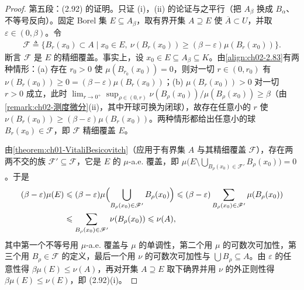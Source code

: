 \documentclass[../../main.tex]{subfiles}%
\begin{document}
\begin{proof}
第五段：(2.92) 的证明。只证 (i)，(ii) 的论证与之平行（把 $A_\beta$ 换成 $B_\alpha$、不等号反向）。固定 Borel 集 $E\subseteq A_\beta$，取有界开集 $A\supseteq E$ 使 $\overline{A}\subset U$，并取 $\varepsilon\in(0,\beta)$。令
\begin{align*}
\mathscr{F}\triangleq\{B_r(x_0)\subset A\mid x_0\in E,\ \nu(B_r(x_0))\geqslant(\beta-\varepsilon)\mu(B_r(x_0))\}.
\end{align*}
断言 $\mathscr{F}$ 是 $E$ 的精细覆盖。事实上，设 $x_0\in E\subseteq A_\beta\subseteq K$。由\eqref{align:ch02-2.83}有两种情形：(a) 存在 $r_0>0$ 使 $\mu(B_{r_0}(x_0))=0$，则对一切 $r\in(0,r_0)$ 有 $\nu(B_r(x_0))\geqslant0=(\beta-\varepsilon)\mu(B_r(x_0))$；(b) $\mu(B_r(x_0))>0$ 对一切 $r>0$ 成立，此时 $\lim_{r\to0^+}\sup_{\rho\in(0,r)}\nu(B_\rho(x_0))/\mu(B_\rho(x_0))\geqslant\beta$（由\cref{remark:ch02-测度微分}(ii)，其中开球可换为闭球），故存在任意小的 $r$ 使 $\nu(B_r(x_0))\geqslant(\beta-\varepsilon)\mu(B_r(x_0))$。两种情形都给出任意小的球 $B_r(x_0)\in\mathscr{F}$，即 $\mathscr{F}$ 精细覆盖 $E$。

由\cref{theorem:ch01-VitaliBesicovitch}（应用于有界集 $A$ 与其精细覆盖 $\mathscr{F}$），存在两两不交的族 $\mathscr{F}'\subseteq\mathscr{F}$，它是 $E$ 的 $\mu$-a.e. 覆盖，即 $\mu\bigl(E\setminus\bigcup_{B_\rho(x_0)\in\mathscr{F}'}B_\rho(x_0)\bigr)=0$。于是
\begin{align*}
(\beta-\varepsilon)\mu(E)&\leqslant(\beta-\varepsilon)\mu\Bigl(\bigcup_{B_\rho(x_0)\in\mathscr{F}'}B_\rho(x_0)\Bigr)\leqslant(\beta-\varepsilon)\sum_{B_\rho(x_0)\in\mathscr{F}'}\mu(B_\rho(x_0))\\
&\leqslant\sum_{B_\rho(x_0)\in\mathscr{F}'}\nu(B_\rho(x_0))\leqslant\nu(A),
\end{align*}
其中第一个不等号用 $\mu$-a.e. 覆盖与 $\mu$ 的单调性，第二个用 $\mu$ 的可数次可加性，第三个用 $B_\rho\in\mathscr{F}$ 的定义，最后一个用 $\nu$ 的可数次可加性与 $\bigcup B_\rho\subseteq A$。由 $\varepsilon$ 的任意性得 $\beta\mu(E)\leqslant\nu(A)$，再对开集 $A\supseteq E$ 取下确界并用 $\nu$ 的外正则性得 $\beta\mu(E)\leqslant\nu(E)$，即 (2.92)(i)。
\end{proof}
\end{document}
